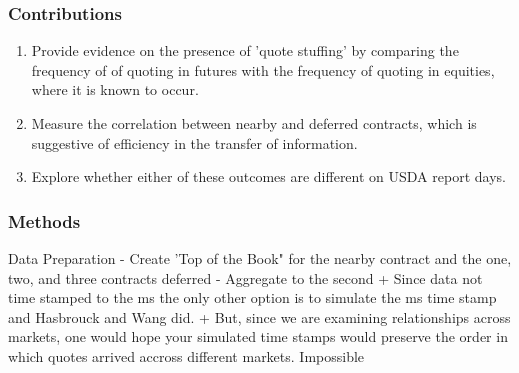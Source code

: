 \documentclass[t]{beamer}
\begin{document}
\begin{frame}
\frametitle{Contributions}
\begin{enumerate}
\item Provide evidence on the presence of 'quote stuffing' by comparing the frequency of of quoting in futures with the frequency of quoting in equities, where it is known to occur.\\

\item Measure the correlation between nearby and deferred contracts, which is suggestive of efficiency in the transfer of information.
\item Explore whether either of these outcomes are different on USDA report days.
\end{enumerate}


\end{frame}


\begin{frame}
\frametitle{Methods}
Data Preparation
- Create 'Top of the Book" for the nearby contract and the one, two, and three contracts deferred
- Aggregate to the second
  + Since data not time stamped to the ms the only other option is to simulate the ms time stamp and Hasbrouck and Wang did.  
  + But, since we are examining relationships across markets, one would hope your simulated time stamps would preserve the order in which quotes arrived accross different markets. Impossible


\end{frame}
\end{document}
